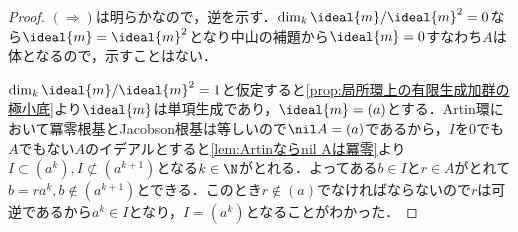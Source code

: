 \begin{proof}
	$(\Longrightarrow)$は明らかなので，逆を示す．$\dim_k \ideal{m}/\ideal{m}^2=0$なら$\ideal{m}=\ideal{m}^2$となり中山の補題から$\ideal{m}=0$すなわち$A$は体となるので，示すことはない．
	
	$\dim_k \ideal{m}/\ideal{m}^2=1$と仮定すると\ref{prop:局所環上の有限生成加群の極小底}より$\ideal{m}$は単項生成であり，$\ideal{m}=(a)$とする．Artin環において冪零根基とJacobson根基は等しいので$\nil A=(a)$であるから，$I$を$0$でも$A$でもない$A$のイデアルとすると\ref{lem:Artinならnil Aは冪零}より$I\subset(a^k),I\not\subset(a^{k+1})$となる$k\in\N$がとれる．よってある$b\in I$と$r\in A$がとれて$b=ra^k,b\not\in(a^{k+1})$とできる．このとき$r\not\in(a)$でなければならないので$r$は可逆であるから$a^k\in I$となり，$I=(a^k)$となることがわかった．
\end{proof}

%

